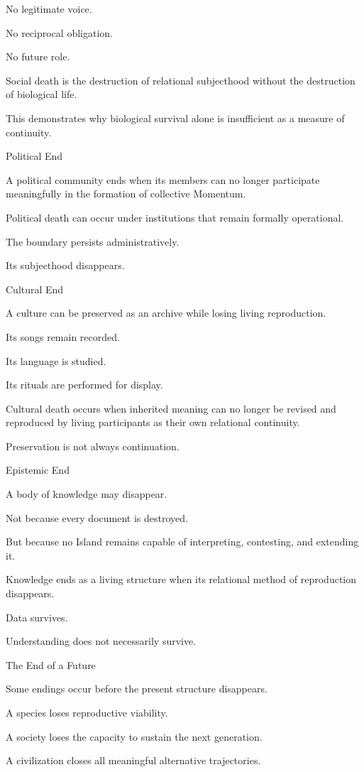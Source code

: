 No legitimate voice.

No reciprocal obligation.

No future role.

Social death is the destruction of relational subjecthood without the destruction of biological life.

This demonstrates why biological survival alone is insufficient as a measure of continuity.

Political End

A political community ends when its members can no longer participate meaningfully in the formation of collective Momentum.

Political death can occur under institutions that remain formally operational.

The boundary persists administratively.

Its subjecthood disappears.

Cultural End

A culture can be preserved as an archive while losing living reproduction.

Its songs remain recorded.

Its language is studied.

Its rituals are performed for display.

Cultural death occurs when inherited meaning can no longer be revised and reproduced by living participants as their own relational continuity.

Preservation is not always continuation.

Epistemic End

A body of knowledge may disappear.

Not because every document is destroyed.

But because no Island remains capable of interpreting, contesting, and extending it.

Knowledge ends as a living structure when its relational method of reproduction disappears.

Data survives.

Understanding does not necessarily survive.

The End of a Future

Some endings occur before the present structure disappears.

A species loses reproductive viability.

A society loses the capacity to sustain the next generation.

A civilization closes all meaningful alternative trajectories.

